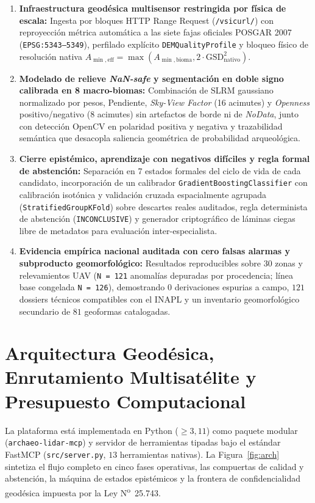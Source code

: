 \documentclass[11pt,a4paper]{article}
\DeclareRobustCommand{\_}{\ifmmode\mbox{\textunderscore}\else\textunderscore\allowbreak\fi}
\begin{document}
\begin{enumerate}
  \item \textbf{Infraestructura geod\'esica multisensor restringida por f\'isica de escala:} Ingesta por bloques HTTP Range Request (\texttt{/vsicurl/}) con reproyecci\'on m\'etrica autom\'atica a las siete fajas oficiales POSGAR 2007 (\texttt{EPSG:5343--5349}), perfilado expl\'icito \texttt{DEMQualityProfile} y bloqueo f\'isico de resoluci\'on nativa $A_{\min,\mathrm{eff}} = \max(A_{\min,\mathrm{bioma}}, 2 \cdot \mathrm{GSD}_{\mathrm{nativo}}^2)$.
  \item \textbf{Modelado de relieve \emph{NaN-safe} y segmentaci\'on en doble signo calibrada en 8 macro-biomas:} Combinaci\'on de SLRM gaussiano normalizado por pesos, Pendiente, \emph{Sky-View Factor} (16 acimutes) y \emph{Openness} positivo/negativo (8 acimutes) sin artefactos de borde ni de \emph{NoData}, junto con detecci\'on OpenCV en polaridad positiva y negativa y trazabilidad sem\'antica que desacopla saliencia geom\'etrica de probabilidad arqueol\'ogica.
  \item \textbf{Cierre epist\'emico, aprendizaje con negativos dif\'iciles y regla formal de abstenci\'on:} Separaci\'on en 7 estados formales del ciclo de vida de cada candidato, incorporaci\'on de un calibrador \texttt{GradientBoostingClassifier} con calibraci\'on isot\'onica y validaci\'on cruzada espacialmente agrupada (\texttt{StratifiedGroupKFold}) sobre descartes reales auditados, regla determinista de abstenci\'on (\texttt{INCONCLUSIVE}) y generador criptogr\'afico de l\'aminas ciegas libre de metadatos para evaluaci\'on inter-especialista.
  \item \textbf{Evidencia emp\'irica nacional auditada con cero falsas alarmas y subproducto geomorfol\'ogico:} Resultados reproducibles sobre 30 zonas y relevamientos UAV (\texttt{N = 121} anomal\'ias depuradas por procedencia; l\'inea base congelada \texttt{N = 126}), demostrando $0$ derivaciones espurias a campo, $121$ dossiers t\'ecnicos compatibles con el INAPL y un inventario geomorfol\'ogico secundario de $81$ geoformas catalogadas.
\end{enumerate}

\section{Arquitectura Geod\'esica, Enrutamiento Multisat\'elite y Presupuesto Computacional}

La plataforma est\'a implementada en Python ($\ge 3{,}11$) como paquete modular (\texttt{archaeo-lidar-mcp}) y servidor de herramientas tipadas bajo el est\'andar FastMCP (\texttt{src/server.py}, $13$ herramientas nativas). La Figura~\ref{fig:arch} sintetiza el flujo completo en cinco fases operativas, las compuertas de calidad y abstenci\'on, la m\'aquina de estados epist\'emicos y la frontera de confidencialidad geod\'esica impuesta por la Ley N\textsuperscript{o}~25.743.
\end{document}
